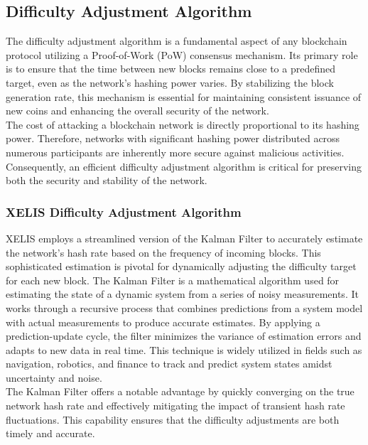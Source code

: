 \documentclass[10pt,a4paper,twocolumn]{article}
\begin{document}
\subsection{Difficulty Adjustment Algorithm}

The difficulty adjustment algorithm is a fundamental aspect of any blockchain protocol utilizing a Proof-of-Work (PoW) consensus mechanism. Its primary role is to ensure that the time between new blocks remains close to a predefined target, even as the network’s hashing power varies. By stabilizing the block generation rate, this mechanism is essential for maintaining consistent issuance of new coins and enhancing the overall security of the network.\\

The cost of attacking a blockchain network is directly proportional to its hashing power. Therefore, networks with significant hashing power distributed across numerous participants are inherently more secure against malicious activities. Consequently, an efficient difficulty adjustment algorithm is critical for preserving both the security and stability of the network.\\

\subsubsection{XELIS Difficulty Adjustment Algorithm}

XELIS employs a streamlined version of the Kalman Filter to accurately estimate the network’s hash rate based on the frequency of incoming blocks. This sophisticated estimation is pivotal for dynamically adjusting the difficulty target for each new block. The Kalman Filter is a mathematical algorithm used for estimating the state of a dynamic system from a series of noisy measurements. It works through a recursive process that combines predictions from a system model with actual measurements to produce accurate estimates. By applying a prediction-update cycle, the filter minimizes the variance of estimation errors and adapts to new data in real time. This technique is widely utilized in fields such as navigation, robotics, and finance to track and predict system states amidst uncertainty and noise.\\

The Kalman Filter offers a notable advantage by quickly converging on the true network hash rate and effectively mitigating the impact of transient hash rate fluctuations. This capability ensures that the difficulty adjustments are both timely and accurate.\\
\end{document}
